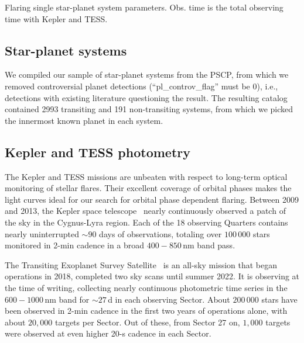 \documentclass[twocolumn]{aastex631}
\begin{document}
\begin{table*}
\begin{rotatetable*}
 \caption{Flaring single star-planet system parameters. Obs. time is the total observing time with Kepler and TESS.}
\movetableright=-40mm
   
\footnotesize

    
        \label{tab:maintable_lit}
    \tablerefs{}
\end{rotatetable*}
\end{table*}


\subsection{Star-planet systems}
\label{sec:data:sps}
We compiled our sample of star-planet systems from the PSCP, from which we removed controversial planet detections (``pl\_controv\_flag'' must be 0), i.e., detections with existing literature questioning the result. The resulting catalog contained 2993 transiting and 191 non-transiting systems, from which we picked the innermost known planet in each system. 

\subsection{Kepler and TESS photometry}
\label{sec:data:photometry}
The Kepler and TESS missions are unbeaten with respect to long-term optical monitoring of stellar flares. Their excellent coverage of orbital phases makes the light curves ideal for our search for orbital phase dependent flaring. Between 2009 and 2013, the Kepler space telescope~\citep{koch2010kepler} nearly continuously observed a patch of the sky in the Cygnus-Lyra region. Each of the 18 observing Quarters contains nearly uninterrupted $\sim 90$ days of observations, totaling over $100\,000$ stars monitored in 2-min cadence in a broad $400-850\,$nm band pass.

The Transiting Exoplanet Survey Satellite~\citep[TESS,][]{ricker2015transiting} is an all-sky mission that began operations in 2018, completed two sky scans until summer 2022. It is observing at the time of writing, collecting nearly continuous photometric time series in the $600-1000\,$nm band for $\sim 27\,$d in each observing Sector. About $200\,000$ stars have been observed in 2-min cadence in the first two years of operations alone, with about $20,000$ targets per Sector. Out of these, from Sector 27 on, $1,000$ targets were observed at even higher 20-s cadence in each Sector. 
\end{document}

